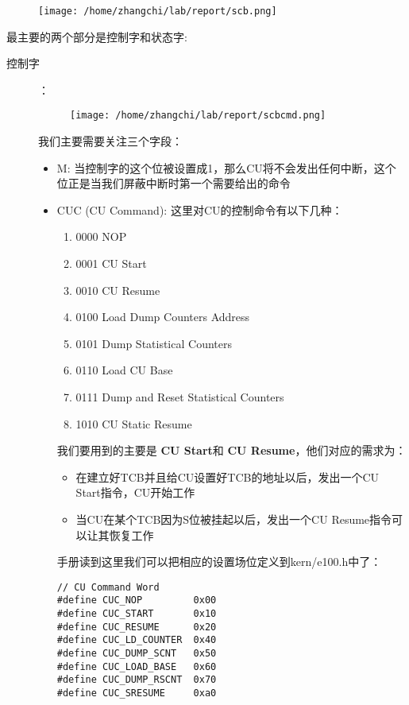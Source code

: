 \documentclass{article}
\newcommand{\highlight}[1]{{\bfseries \color{red}  #1}}
\begin{document}
\begin{CJK*}{UTF8}{gkai}
\begin{figure}[htp]
\centering
\texttt{[image: /home/zhangchi/lab/report/scb.png]}
\end{figure}

最主要的两个部分是控制字和状态字:

\begin{description}
\item[控制字]：\\
\begin{figure}[htp]
\centering
\texttt{[image: /home/zhangchi/lab/report/scbcmd.png]}
\end{figure}

我们主要需要关注三个字段：

\begin{itemize}
\item{M: 当控制字的这个位被设置成1，那么CU将不会发出任何中断，这个位正是当我们屏蔽中断时第一个需要给出的命令}
\item{CUC (CU Command): 这里对CU的控制命令有以下几种：

\begin{enumerate}
\item{0000 NOP}
\item{0001 CU Start}
\item{0010 CU Resume}
\item{0100 Load Dump Counters Address}
\item{0101 Dump Statistical Counters}
\item{0110 Load CU Base}
\item{0111 Dump and Reset Statistical Counters}
\item{1010 CU Static Resume} 
\end{enumerate}

我们要用到的主要是\highlight{CU Start}和\highlight{CU Resume}，他们对应的需求为：

\begin{itemize}
\item{在建立好TCB并且给CU设置好TCB的地址以后，发出一个CU Start指令，CU开始工作}
\item{当CU在某个TCB因为S位被挂起以后，发出一个CU Resume指令可以让其恢复工作}
\end{itemize}

手册读到这里我们可以把相应的设置场位定义到kern/e100.h中了：

\begin{lstlisting}[style=ccode, title={\scriptsize \ttfamily \bfseries kern/e100.h}]
// CU Command Word
#define CUC_NOP         0x00
#define CUC_START       0x10
#define CUC_RESUME      0x20
#define CUC_LD_COUNTER  0x40
#define CUC_DUMP_SCNT   0x50
#define CUC_LOAD_BASE   0x60
#define CUC_DUMP_RSCNT  0x70
#define CUC_SRESUME     0xa0
\end{lstlisting}

}
\end{itemize}
\end{description}
\end{CJK*}
\end{document}
